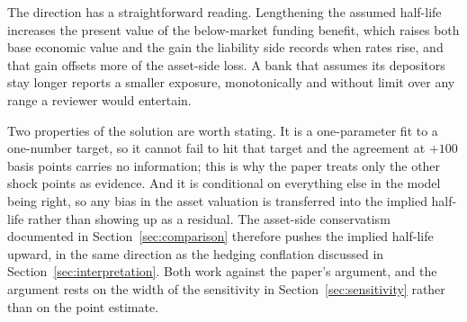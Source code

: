 The direction has a straightforward reading. Lengthening the assumed half-life
increases the present value of the below-market funding benefit, which raises both
base economic value and the gain the liability side records when rates rise, and that
gain offsets more of the asset-side loss. A bank that assumes its depositors stay
longer reports a smaller exposure, monotonically and without limit over any range a
reviewer would entertain.

Two properties of the solution are worth stating. It is a one-parameter fit to a
one-number target, so it cannot fail to hit that target and the agreement at $+100$
basis points carries no information; this is why the paper treats only the other
shock points as evidence. And it is conditional on everything else in the model being
right, so any bias in the asset valuation is transferred into the implied half-life
rather than showing up as a residual. The asset-side conservatism documented in
Section~\ref{sec:comparison} therefore pushes the implied half-life upward, in the
same direction as the hedging conflation discussed in
Section~\ref{sec:interpretation}. Both work against the paper's argument, and the
argument rests on the width of the sensitivity in Section~\ref{sec:sensitivity}
rather than on the point estimate.
